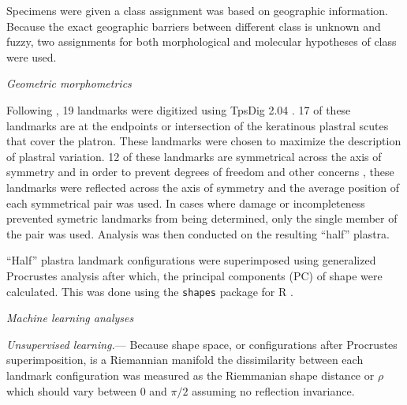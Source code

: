 \documentclass[12pt,letterpaper]{article}\usepackage{graphicx, color}
\renewcommand{\subsection}[1]{%
\bigskip
\begin{center}
\begin{large}
\normalfont\itshape #1
\end{large}
\end{center}}
\renewcommand{\subsubsection}[1]{%
\vspace{2ex}
\noindent
\textit{#1.}---}
\begin{document}
Specimens were given a class assignment was based on geographic information. Because the exact geographic barriers between different class is unknown and fuzzy, two assignments for both morphological and molecular hypotheses of class were used. 

\subsection{Geometric morphometrics}
Following \citet{Angielczyk2011}, 19 landmarks were digitized using TpsDig 2.04 \citep{Rohlf2005}. 17 of these landmarks are at the endpoints or intersection of the keratinous plastral scutes that cover the platron. These landmarks were chosen to maximize the description of plastral variation. 12 of these landmarks are symmetrical across the axis of symmetry and in order to prevent degrees of freedom and other concerns \citep{Klingenberg2007}, these landmarks were reflected across the axis of symmetry and the average position of each symmetrical pair was used. In cases where damage or incompleteness prevented symetric landmarks from being determined, only the single member of the pair was used. Analysis was then conducted on the resulting ``half'' plastra.

``Half'' plastra landmark configurations were superimposed using generalized Procrustes analysis \citep{Dryden1998a} after which, the principal components (PC) of shape were calculated. This was done using the \texttt{shapes} package for R \citep{2013, Dryden2013}.


\subsection{Machine learning analyses}
\subsubsection{Unsupervised learning}
Because shape space, or configurations after Procrustes superimposition, is a Riemannian manifold \citep{Dryden1998a} the dissimilarity between each landmark configuration was measured as the Riemmanian shape distance or \(\rho\) \citep{Kendall1984a,Dryden1998a} which should vary between 0 and \(\pi / 2\) assuming no reflection invariance.
\end{document}
